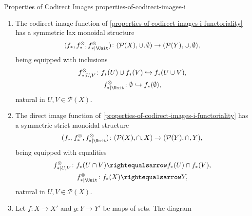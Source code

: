 \begin{proposition}{Properties of Codirect Images \rmI}{properties-of-codirect-images-i}
\begin{enumerate}
\[\begin{gathered}
                    f^{-1}(U\cap V) = f_{*}(U)\cap f^{-1}(V),\\
                    f_{*}(X)        = Y,
                \end{gathered}
            \]%
            natural in $U,V\in\mathcal{P}(X)$.
        \item\label{properties-of-codirect-images-i-symmetric-lax-monoidality-with-respect-to-unions}The codirect image function of \cref{properties-of-codirect-images-i-functoriality} has a symmetric lax monoidal structure
            \[
                (f_{*},f^{\otimes}_{*},f^{\otimes}_{*|\Unit})
                \colon
                (\mathcal{P}(X),\cup,\emptyset)
                \to
                (\mathcal{P}(Y),\cup,\emptyset),
            \]%
            being equipped with inclusions%
            \[
                \begin{gathered}
                    f^{\otimes}_{*|U,V}   \colon f_{*}(U)\cup f_{*}(V) \hookrightarrow f_{*}(U\cup V),\\
                    f^{\otimes}_{*|\Unit} \colon \emptyset             \hookrightarrow f_{*}(\emptyset),
                \end{gathered}
            \]%
            natural in $U,V\in\mathcal{P}(X)$.
        \item\label{properties-of-codirect-images-i-symmetric-strict-monoidality-with-respect-to-intersections}The direct image function of \cref{properties-of-codirect-images-i-functoriality} has a symmetric strict monoidal structure
            \[
                (f_{*},f^{\otimes}_{*},f^{\otimes}_{*|\Unit})
                \colon
                (\mathcal{P}(X),\cap,X)
                \to
                (\mathcal{P}(Y),\cap,Y),
            \]%
            being equipped with equalities%
            \[
                \begin{gathered}
                    f^{\otimes}_{*|U,V}   \colon f_{*}(U\cap V) \rightequalsarrow f_{*}(U)\cap f_{*}(V),\\
                    f^{\otimes}_{*|\Unit} \colon f_{*}(X)       \rightequalsarrow Y,
                \end{gathered}
            \]%
            natural in $U,V\in\mathcal{P}(X)$.
        \item\label{properties-of-codirect-images-i-interaction-with-coproducts}Let $f\colon X\to X'$ and $g\colon Y\to Y'$ be maps of sets. The diagram

\end{enumerate}
\end{proposition}
